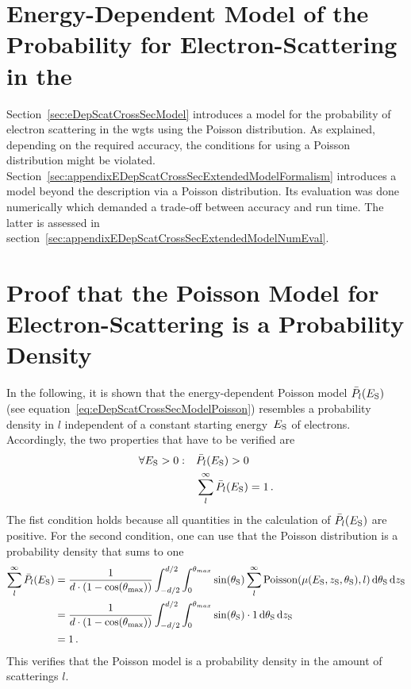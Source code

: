 \section{Energy-Dependent Model of the Probability for Electron-Scattering in the }
\label{sec:appendixEDepScatCrossSecExtendedModel}
Section~\ref{sec:eDepScatCrossSecModel} introduces a model for the probability of electron scattering in the \gls{wgts} using the Poisson distribution. As explained, depending on the required accuracy, the conditions for using a Poisson distribution might be violated. Section~\ref{sec:appendixEDepScatCrossSecExtendedModelFormalism} introduces a model beyond the description via a Poisson distribution. Its evaluation was done numerically which demanded a trade-off between accuracy and run time. The latter is assessed in section~\ref{sec:appendixEDepScatCrossSecExtendedModelNumEval}.


\section{Proof that the Poisson Model for Electron-Scattering is a Probability Density}
\label{sec:appendixEDepScatCrossSecPoissonModelProbDensityProof}
In the following, it is shown that the energy-dependent Poisson model $\bar{P}_l(E_\mathrm{S})$ (see equation~\ref{eq:eDepScatCrossSecModelPoisson}) resembles a probability density in $l$ independent of a constant starting energy~$E_\mathrm{S}$ of electrons. Accordingly, the two properties that have to be verified are
\begin{align}
\forall E_\mathrm{S} > 0: \quad
&\bar{P}_l(E_\mathrm{S}) > 0 \\
&\sum_{l}^{\infty} \bar{P}_l(E_\mathrm{S}) = 1
\text{\,.}
\end{align}
The fist condition holds because all quantities in the calculation of $\bar{P}_l(E_\mathrm{S})$ are positive. For the second condition, one can use that the Poisson distribution is a probability density that sums to one
\begin{align*}
\sum_{l}^{\infty} \bar{P}_l(E_\mathrm{S}) &=
\frac{1}{d \cdot (1-\cos(\theta_\mathrm{max}))} 
\int_{-d/2}^{d/2}  
\int_{0}^{\theta_{max}} 
\sin(\theta_\mathrm{S})
\sum_{l}^{\infty}
\mathrm{Poisson}(\mu(E_\mathrm{S},z_\mathrm{S},\theta_\mathrm{S}),l)
\mathop{}\!\mathrm{d}\theta_\mathrm{S}
\mathop{}\!\mathrm{d}z_\mathrm{S} \\  &=
\frac{1}{d \cdot (1-\cos(\theta_\mathrm{max}))} 
\int_{-d/2}^{d/2}  
\int_{0}^{\theta_{max}} 
\sin(\theta_\mathrm{S})
\cdot 1
\mathop{}\!\mathrm{d}\theta_\mathrm{S}
\mathop{}\!\mathrm{d}z_\mathrm{S} \\ &= 1
\text{\,.}
\end{align*}
This verifies that the Poisson model is a probability density in the amount of scatterings $l$.
\clearpage

